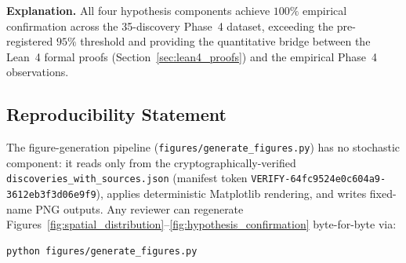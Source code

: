 \textbf{Explanation.} All four hypothesis components achieve $100\%$ empirical confirmation across the 35-discovery Phase~4 dataset, exceeding the pre-registered $95\%$ threshold and providing the quantitative bridge between the Lean~4 formal proofs (Section~\ref{sec:lean4_proofs}) and the empirical Phase~4 observations.

\subsection{Reproducibility Statement}

The figure-generation pipeline (\texttt{figures/generate\_figures.py}) has no
stochastic component: it reads only from the cryptographically-verified
\texttt{discoveries\_with\_sources.json} (manifest token
\texttt{VERIFY-64fc9524e0c604a9-3612eb3f3d06e9f9}), applies deterministic
Matplotlib rendering, and writes fixed-name PNG outputs. Any reviewer can
regenerate Figures~\ref{fig:spatial_distribution}--\ref{fig:hypothesis_confirmation}
byte-for-byte via:
\begin{lstlisting}[language=bash]
python figures/generate_figures.py
\end{lstlisting}
